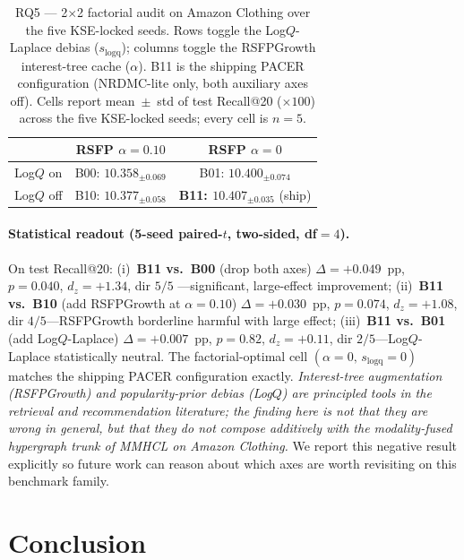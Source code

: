 \documentclass[conference]{IEEEtran}
\begin{document}
\begin{table}[!t]
\caption{RQ5 --- 2$\times$2 factorial audit on Amazon Clothing over
the five KSE-locked seeds. Rows toggle the Log$Q$-Laplace debias
($s_{\text{logq}}$); columns toggle the RSFPGrowth interest-tree
cache ($\alpha$). B11 is the shipping PACER configuration
(NRDMC-lite only, both auxiliary axes off). Cells report
mean~$\pm$~std of test Recall@20 ($\times 100$) across the five
KSE-locked seeds; every cell is $n{=}5$.}
\label{tab:factorial}
\centering
\renewcommand{\arraystretch}{1.10}
\setlength{\tabcolsep}{5pt}
\begin{tabular}{lcc}
\toprule
& RSFP $\alpha{=}0.10$ & RSFP $\alpha{=}0$ \\
\midrule
Log$Q$ on  & B00: $10.358_{\pm 0.069}$ & B01: $10.400_{\pm 0.074}$ \\
Log$Q$ off & B10: $10.377_{\pm 0.058}$ & \textbf{B11: $\mathbf{10.407_{\pm 0.035}}$} (ship) \\
\bottomrule
\end{tabular}
\end{table}

\paragraph{Statistical readout (5-seed paired-$t$, two-sided, df$=4$).}
On test Recall@20: (i)~\textbf{B11 vs.\ B00} (drop both axes)
$\Delta{=}+0.049$~pp, $p{=}0.040$, $d_z{=}+1.34$, dir $5/5$
---significant, large-effect improvement;
(ii)~\textbf{B11 vs.\ B10} (add RSFPGrowth at $\alpha{=}0.10$)
$\Delta{=}+0.030$~pp, $p{=}0.074$, $d_z{=}+1.08$, dir $4/5$---RSFPGrowth
borderline harmful with large effect;
(iii)~\textbf{B11 vs.\ B01} (add Log$Q$-Laplace)
$\Delta{=}+0.007$~pp, $p{=}0.82$, $d_z{=}+0.11$, dir $2/5$---Log$Q$-Laplace
statistically neutral.
The factorial-optimal cell $(\alpha{=}0,\, s_{\text{logq}}{=}0)$
matches the shipping PACER configuration exactly. \emph{Interest-tree
augmentation (RSFPGrowth) and popularity-prior debias (Log$Q$) are
principled tools in the retrieval and recommendation literature; the
finding here is not that they are wrong in general, but that they do
not compose additively with the modality-fused hypergraph trunk of
MMHCL on Amazon Clothing.} We report this negative result explicitly
so future work can reason about which axes are worth revisiting on
this benchmark family.

\section{Conclusion}
\end{document}
